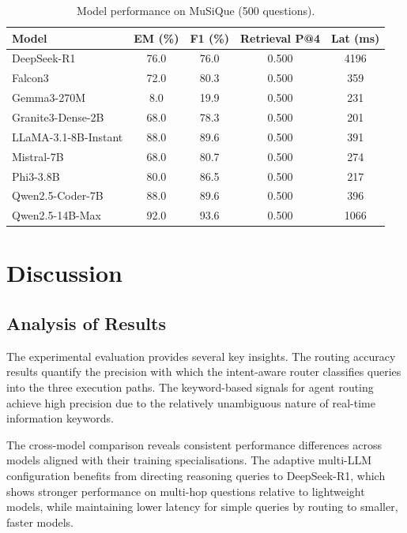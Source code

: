 \documentclass[12pt,a4paper]{article}
\begin{document}
\begin{table}[htbp]
  \centering
  \caption{Model performance on MuSiQue (500 questions).}
  \label{tab:musique}
  \begin{tabular}{lcccc}
    \hline
    \textbf{Model}
      & \textbf{EM (\%)}
      & \textbf{F1 (\%)}
      & \textbf{Retrieval P@4}
      & \textbf{Lat (ms)} \\
    \hline
    DeepSeek-R1            & 76.0 & 76.0 & 0.500 & 4196 \\
    Falcon3                & 72.0 & 80.3 & 0.500 &  359 \\
    Gemma3-270M            &  8.0 & 19.9 & 0.500 &  231 \\
    Granite3-Dense-2B      & 68.0 & 78.3 & 0.500 &  201 \\
    LLaMA-3.1-8B-Instant   & 88.0 & 89.6 & 0.500 &  391 \\
    Mistral-7B             & 68.0 & 80.7 & 0.500 &  274 \\
    Phi3-3.8B              & 80.0 & 86.5 & 0.500 &  217 \\
    Qwen2.5-Coder-7B       & 88.0 & 89.6 & 0.500 &  396 \\
    Qwen2.5-14B-Max        & 92.0 & 93.6 & 0.500 & 1066 \\
    \hline
  \end{tabular}
\end{table}

\section{Discussion}

\subsection{Analysis of Results}

The experimental evaluation provides several key insights. The routing accuracy results quantify the precision with which the intent-aware router classifies queries into the three execution paths. The keyword-based signals for agent routing achieve high precision due to the relatively unambiguous nature of real-time information keywords.

The cross-model comparison reveals consistent performance differences across models aligned with their training specialisations. The adaptive multi-LLM configuration benefits from directing reasoning queries to DeepSeek-R1, which shows stronger performance on multi-hop questions relative to lightweight models, while maintaining lower latency for simple queries by routing to smaller, faster models.
\end{document}
